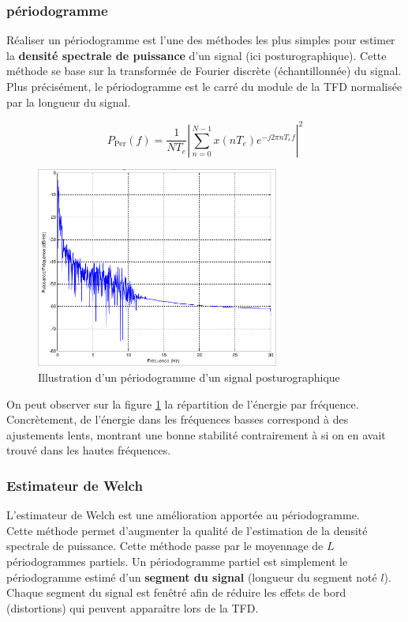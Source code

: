 \subsubsection{périodogramme}
\label{subsubsec:periodogramme}

Réaliser un périodogramme est l'une des méthodes les plus simples pour estimer la \textbf{densité spectrale de puissance} d'un signal (ici posturographique).
Cette méthode se base sur la transformée de Fourier discrète (échantillonnée) du signal.
Plus précisément, le périodogramme est le carré du module de la TFD normalisée par la longueur du signal.

\begin{equation}
  P_{\text{Per}}(f)=\frac{1}{NT_e}\left|\sum\limits_{n=0}^{N-1}x(nT_e)e^{-j2\pi nT_ef}\right|^2
  \label{eq:P_per}
\end{equation}

\begin{figure}[ht]
  \centering
  \includegraphics[width=8cm]{images/methode/periodogramme.png}
  \caption{Illustration d'un périodogramme d'un signal posturographique}
  \label{fig:periodogramme}
\end{figure}

On peut observer sur la figure \ref{fig:periodogramme} la répartition de l'énergie par fréquence.
Concrètement, de l'énergie dans les fréquences basses correspond à des ajustements lents, montrant une bonne stabilité contrairement à si on en avait trouvé dans les hautes fréquences.

\subsubsection{Estimateur de Welch}

L'estimateur de Welch est une amélioration apportée au périodogramme. \\
Cette méthode permet d'augmenter la qualité de l'estimation de la densité spectrale de puissance.
Cette méthode passe par le moyennage de $L$ périodogrammes partiels.
Un périodogramme partiel est simplement le périodogramme estimé d'un \textbf{segment du signal} (longueur du segment noté $l$).
Chaque segment du signal est fenêtré afin de réduire les effets de bord (distortions) qui peuvent apparaître lors de la TFD.

